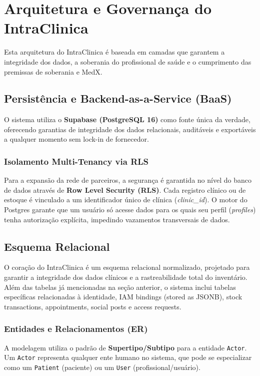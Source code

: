  \chapter{Arquitetura e Governança do IntraClinica}

Esta arquitetura do IntraClinica é baseada em camadas que garantem a integridade dos dados, a soberania do profissional de saúde e o cumprimento das premissas de soberania e MedX.

\section{Persistência e Backend-as-a-Service (BaaS)}

O sistema utiliza o \textbf{Supabase (PostgreSQL 16)} como fonte única da verdade, oferecendo garantias de integridade dos dados relacionais, auditáveis e exportáveis a qualquer momento sem lock-in de fornecedor.

\subsection{Isolamento Multi-Tenancy via RLS}
Para a expansão da rede de parceiros, a segurança é garantida no nível do banco de dados através de \textbf{Row Level Security (RLS)}. Cada registro clínico ou de estoque é vinculado a um identificador único de clínica (\textit{clinic\_id}). O motor do Postgres garante que um usuário só acesse dados para os quais seu perfil (\textit{profiles}) tenha autorização explícita, impedindo vazamentos transversais de dados.

\section{Esquema Relacional}

O coração do IntraClinica é um esquema relacional normalizado, projetado para garantir a integridade dos dados clínicos e a rastreabilidade total do inventário. Além das tabelas já mencionadas na seção anterior, o sistema inclui tabelas específicas relacionadas à identidade, IAM bindings (stored as JSONB), stock transactions, appointments, social posts e access requests.

\subsection{Entidades e Relacionamentos (ER)}

A modelagem utiliza o padrão de \textbf{Supertipo/Subtipo} para a entidade \texttt{Actor}. Um \texttt{Actor} representa qualquer ente humano no sistema, que pode se especializar como um \texttt{Patient} (paciente) ou um \texttt{User} (profissional/usuário).

